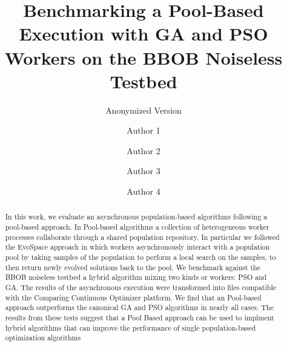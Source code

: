 \documentclass[sigconf]{acmart}
\begin{document}
\title{ Benchmarking a Pool-Based Execution with GA and PSO Workers  
on the BBOB Noiseless Testbed}
\subtitle{Anonymized Version}


\author{Author 1}

\author{Author 2}

\author{Author 3}

\author{Author 4}



\begin{abstract}
In this work, we  evaluate an asynchronous population-based 
algorithms following a pool-based approach. In Pool-based 
algorithms a collection of heterogeneous worker processes 
collaborate through a shared population repository. In particular
we followed the EvoSpace approach in which workers 
asynchronously interact with a population pool by taking 
samples of the population to perform a local search on the 
samples, to then return newly evolved solutions back to the 
pool. We benchmark  against the BBOB noiseless testbed a 
hybrid algorithm mixing two kinds or workers:  PSO  and GA. 
The results of the asynchronous execution were transformed 
into files compatible with the Comparing Continuous Optimizer 
platform. We find that an Pool-based approach outperforms
the canonical GA and PSO algorithms in nearly all cases. 
The results from these tests suggest that a Pool Based approach 
can be used to implment hybrid algorithms that can improve 
the performance of single population-based optimization algorithms   
\end{abstract}
\end{document}
